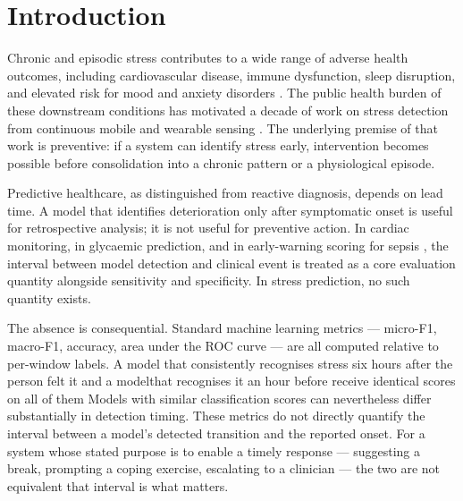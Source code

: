 \documentclass[preprint,12pt,authoryear]{elsarticle}
\providecommand{\DIFaddtex}[1]{{\protect\color{blue} \sf #1}} %
\providecommand{\DIFdeltex}[1]{{\protect\color{red} \scriptsize #1}} %
\providecommand{\DIFaddbegin}{} %
\providecommand{\DIFaddend}{} %
\providecommand{\DIFdelbegin}{} %
\providecommand{\DIFdelend}{} %
\providecommand{\DIFadd}[1]{\texorpdfstring{\DIFaddtex{#1}}{#1}} %
\providecommand{\DIFdel}[1]{\texorpdfstring{\DIFdeltex{#1}}{}} %
\newcommand{\DIFscaledelfig}{0.5}
\newlength{\DIFdelgraphicswidth} %
\newlength{\DIFdelgraphicsheight} %
\newcommand{\DIFaddincludegraphics}[2][]{{\color{blue}\fbox{\DIFOincludegraphics[#1]{#2}}}} %
\newcommand{\DIFdelincludegraphics}[2][]{%
\sbox{\DIFdelgraphicsbox}{\DIFOincludegraphics[#1]{#2}}%
\settoboxwidth{\DIFdelgraphicswidth}{\DIFdelgraphicsbox} %
\settoboxtotalheight{\DIFdelgraphicsheight}{\DIFdelgraphicsbox} %
\scalebox{\DIFscaledelfig}{%
\parbox[b]{\DIFdelgraphicswidth}{\usebox{\DIFdelgraphicsbox}\\[-\baselineskip] \rule{\DIFdelgraphicswidth}{0em}}\llap{\resizebox{\DIFdelgraphicswidth}{\DIFdelgraphicsheight}{%
\setlength{\unitlength}{\DIFdelgraphicswidth}%
\begin{picture}(1,1)%
\thicklines\linethickness{2pt} %
{\color[rgb]{1,0,0}\put(0,0){\framebox(1,1){}}}%
{\color[rgb]{1,0,0}\put(0,0){\line( 1,1){1}}}%
{\color[rgb]{1,0,0}\put(0,1){\line(1,-1){1}}}%
\end{picture}%
}\hspace*{3pt}}} %
} %
\DeclareRobustCommand{\DIFaddbegin}{\DIFOaddbegin \let\includegraphics\DIFaddincludegraphics} %
\DeclareRobustCommand{\DIFaddend}{\DIFOaddend \let\includegraphics\DIFOincludegraphics} %
\DeclareRobustCommand{\DIFdelbegin}{\DIFOdelbegin \let\includegraphics\DIFdelincludegraphics} %
\DeclareRobustCommand{\DIFdelend}{\DIFOaddend \let\includegraphics\DIFOincludegraphics} %
\begin{document}
\section{Introduction}

Chronic and episodic stress contributes to a wide range of adverse health
outcomes, including cardiovascular disease, immune dysfunction, sleep
disruption, and elevated risk for mood and anxiety disorders
\citep{cohen1983,mcewen2007,chrousos2009}. The public health burden of
these downstream conditions has motivated a decade of work on stress
detection from continuous mobile and wearable sensing
\citep{wang2014,schmidt2018,sano2013,gjoreski2016}. The underlying
premise of that work is preventive: if a system can identify stress
early, intervention becomes possible before consolidation into a chronic
pattern or a physiological episode.

Predictive healthcare, as distinguished from reactive diagnosis, depends
on lead time. A model that identifies deterioration only after
symptomatic onset is useful for retrospective analysis; it is not useful
for preventive action. In cardiac monitoring, in glycaemic prediction,
and in early-warning scoring for sepsis
\DIFdelbegin \DIFdel{\citep{henry2015,islam2020,goldstein2017}}\DIFdelend \DIFaddbegin \DIFadd{\citep{ebrahimzadeh2018,debois2022,henry2015,goldstein2017}}\DIFaddend , the interval between model
detection and clinical event is treated as a core evaluation quantity
alongside sensitivity and specificity. In stress prediction, no such
quantity exists.

The absence is consequential. Standard machine learning metrics ---
micro-F1, macro-F1, accuracy, area under the ROC curve --- are all
computed relative to per-window labels. \DIFdelbegin \DIFdel{A model that consistently
recognises stress six hours after the person felt it and a modelthat
recognises it an hour before receive identical scores on all of them}\DIFdelend \DIFaddbegin \DIFadd{Models with similar
classification scores can nevertheless differ substantially in
detection timing. These metrics do not directly quantify the interval
between a model's detected transition and the reported onset}\DIFaddend . For a
system whose stated purpose is to enable a timely response ---
suggesting a break, prompting a coping exercise, escalating to a
clinician --- \DIFdelbegin \DIFdel{the two are not equivalent}\DIFdelend \DIFaddbegin \DIFadd{that interval is what matters}\DIFaddend .
\end{document}
